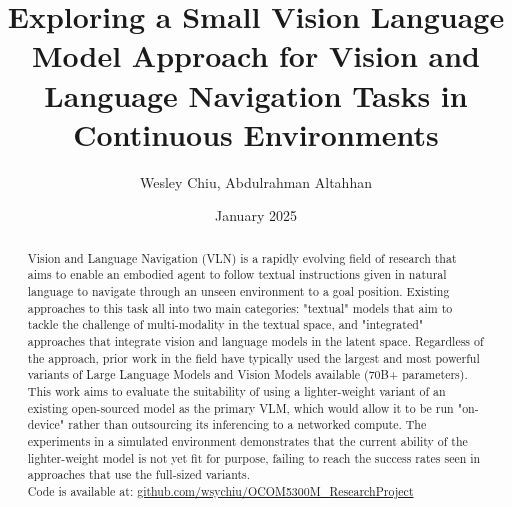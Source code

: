 \documentclass{svproc}
\title{Exploring a Small Vision Language Model Approach for Vision and Language Navigation Tasks in Continuous Environments}
\author{Wesley Chiu, Abdulrahman Altahhan}
\institute{University of Leeds, School of Computing, ODL MSc in AI, UK. \\ \texttt{\{od22wc, a.altahhan\}@leeds.ac.uk}}
\date{January 2025}
\begin{document}

\maketitle

\begin{abstract}
    Vision and Language Navigation (VLN) is a rapidly evolving field of research that aims to enable an embodied agent to follow textual instructions given in natural language to navigate through an unseen environment to a goal position. Existing approaches to this task all into two main categories: "textual" models that aim to tackle the challenge of multi-modality in the textual space, and "integrated" approaches that integrate vision and language models in the latent space. Regardless of the approach, prior work in the field have typically used the largest and most powerful variants of Large Language Models and Vision Models available (70B+ parameters). This work aims to evaluate the suitability of using a lighter-weight variant of an existing open-sourced model  as the primary VLM, which would allow it to be run "on-device" rather than outsourcing its inferencing to a networked compute. The experiments in a simulated environment demonstrates that the current ability of the lighter-weight model is not yet fit for purpose, failing to reach the success rates seen in approaches that use the full-sized variants.
    \\
    Code is available at: \href{https://github.com/wsychiu/OCOM5300M\_ResearchProject}{github.com/wsychiu/OCOM5300M\_ResearchProject}
    
\end{abstract}
\end{document}
